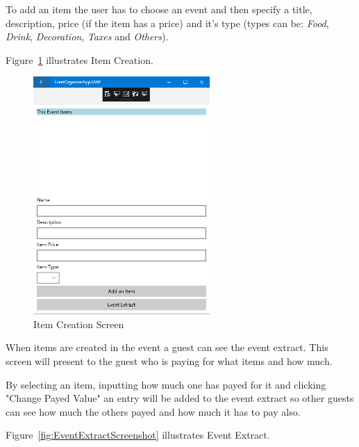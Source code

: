 \newpage

To add an item the user has to choose an event and then specify a title, description, price (if the item has a price) and it's type (types can be: \textit{Food}, \textit{Drink}, \textit{Decoration}, \textit{Taxes} and \textit{Others}).

Figure~\ref{fig:ItemCreationScreenShot} illustrates Item Creation.

\begin{figure}[!ht]
	\centering
	\includegraphics[width=0.60\textwidth,height=0.50\textheight]{./Chapter3/Figures/ClientAppScreenShots/AddItem_08}
	\caption{Item Creation Screen}
	\label{fig:ItemCreationScreenShot}
\end{figure}

\newpage

When items are created in the event a guest can see the event extract. This screen will present to the guest who is paying for what items and how much.

By selecting an item, inputting how much one has payed for it and clicking "Change Payed Value" an entry will be added to the event extract so other guests can see how much the others payed and how much it has to pay also.

Figure~\ref{fig:EventExtractScreenshot} illustrates Event Extract.

